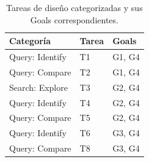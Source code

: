 \begin{table}[h]
\centering
\caption{Tareas de diseño categorizadas y sus Goals correspondientes.}
\label{tab:task-goals}
\begin{tabular}{lll}
\hline
\textbf{Categoría} & \textbf{Tarea} & \textbf{Goals} \\
\hline
Query: Identify & T1 & G1, G4 \\
Query: Compare & T2 & G1, G4 \\
Search: Explore & T3 & G2, G4 \\
Query: Identify & T4 & G2, G4 \\
Query: Compare & T5 & G2, G4 \\
Query: Identify & T6 & G3, G4 \\
Query: Compare & T8 & G3, G4 \\
\hline
\end{tabular}
\end{table}